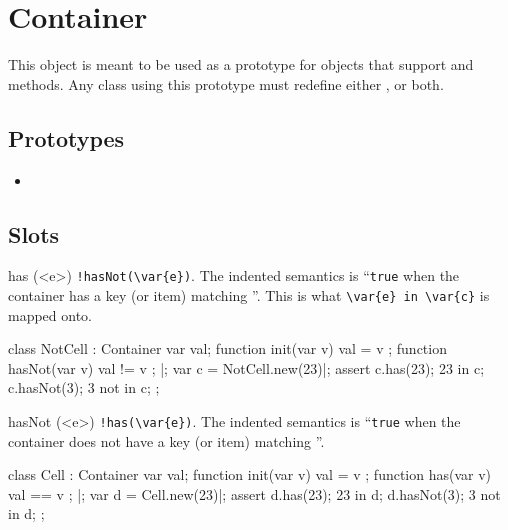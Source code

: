 
\section{Container}

This object is meant to be used as a prototype for objects that support
 and  methods.  Any class using this prototype
must redefine either ,  or both.

\subsection{Prototypes}

\begin{itemize}
\item {}
\end{itemize}

\subsection{Slots}

\begin{urbiscriptapi}
\item[has](<e>)%
  \lstinline|!hasNot(\var{e})|.  The indented semantics is
  ``\lstinline|true| when the container has a key (or item) matching
  ''.  This is what \lstinline|\var{e} in \var{c}| is mapped onto.

\begin{urbiscript}
class NotCell : Container
{
  var val;
  function init(var v)   { val = v };
  function hasNot(var v) { val != v };
}|;
var c = NotCell.new(23)|;
assert
{
  c.has(23);     23 in c;
  c.hasNot(3);    3 not in c;
};
\end{urbiscript}


\item[hasNot](<e>)%
  \lstinline|!has(\var{e})|.  The indented semantics is ``\lstinline|true|
  when the container does not have a key (or item) matching ''.

\begin{urbiscript}
class Cell : Container
{
  var val;
  function init(var v) { val = v };
  function has(var v)  { val == v };
}|;
var d = Cell.new(23)|;
assert
{
  d.has(23);     23 in d;
  d.hasNot(3);    3 not in d;
};
\end{urbiscript}
\end{urbiscriptapi}


